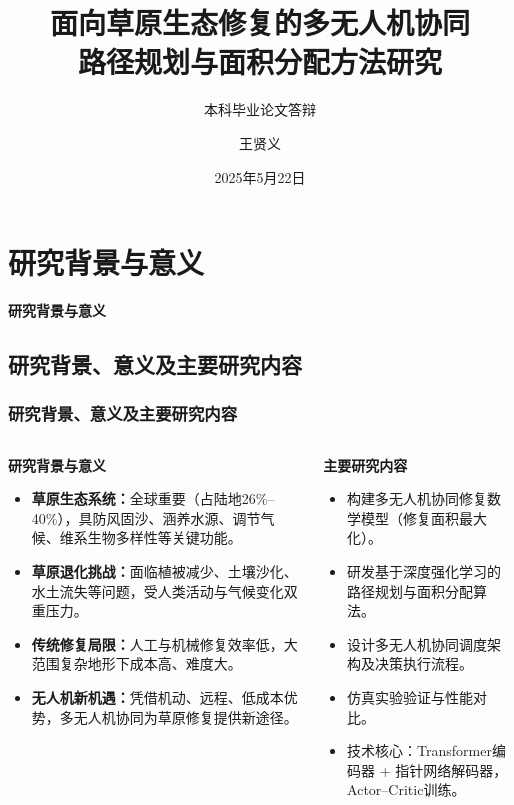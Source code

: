 \documentclass[11pt, aspectratio=169]{beamer}  %
\title{面向草原生态修复的多无人机协同\\路径规划与面积分配方法研究}
\subtitle{本科毕业论文答辩}
\author{王贤义}
\institute{兰州大学信息科学与工程学院}
\date{2025年5月22日}
\begin{document}
\section{研究背景与意义}
\begin{frame}
	\centering %
	{\Huge \sffamily\bfseries\textcolor{njupt}{研究背景与意义}}
	\par %
	\vspace{0.5cm} %
\end{frame}

\subsection{研究背景、意义及主要研究内容}
\begin{frame}
	\frametitle{研究背景、意义及主要研究内容}
	\begin{columns}[T]
		\begin{column}{0.5\textwidth} %
			\small %
			\textbf{研究背景与意义}
			\begin{itemize}
				\item \textbf{草原生态系统：}全球重要（占陆地26\%--40\%），具防风固沙、涵养水源、调节气候、维系生物多样性等关键功能。
				\item \textbf{草原退化挑战：}面临植被减少、土壤沙化、水土流失等问题，受人类活动与气候变化双重压力。
				\item \textbf{传统修复局限：}人工与机械修复效率低，大范围复杂地形下成本高、难度大。
				\item \textbf{无人机新机遇：}凭借机动、远程、低成本优势，多无人机协同为草原修复提供新途径。
			\end{itemize}
		\end{column}
		\begin{column}{0.5\textwidth} %
			\small %
			\textbf{主要研究内容}
			\begin{itemize}
				\item 构建多无人机协同修复数学模型（修复面积最大化）。
				\item 研发基于深度强化学习的路径规划与面积分配算法。
				\item 设计多无人机协同调度架构及决策执行流程。
				\item 仿真实验验证与性能对比。
				\item 技术核心：Transformer编码器 + 指针网络解码器，Actor--Critic训练。
			\end{itemize}
		\end{column}
	\end{columns}
\end{frame}
\end{document}
